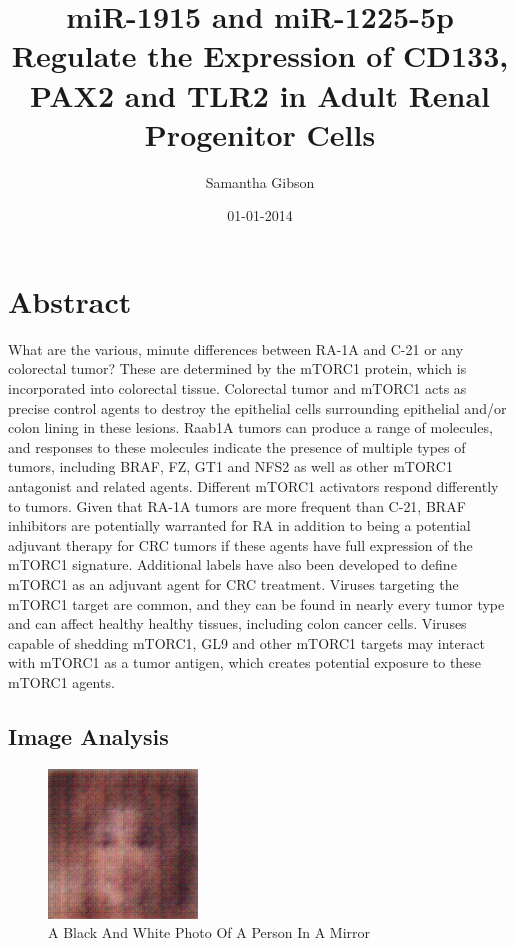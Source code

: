 \documentclass{article}%
\title{miR{-}1915 and miR{-}1225{-}5p Regulate the Expression of CD133, PAX2 and TLR2 in Adult Renal Progenitor Cells}%
\author{Samantha Gibson}%
\affil{Department of Cancer Biology and,}%
\date{01{-}01{-}2014}%
\begin{document}
%
\normalsize%
\maketitle%
\section{Abstract}%
\label{sec:Abstract}%
What are the various, minute differences between RA{-}1A and C{-}21 or any colorectal tumor? These are determined by the mTORC1 protein, which is incorporated into colorectal tissue. Colorectal tumor and mTORC1 acts as precise control agents to destroy the epithelial cells surrounding epithelial and/or colon lining in these lesions.\newline%
Raab1A tumors can produce a range of molecules, and responses to these molecules indicate the presence of multiple types of tumors, including BRAF, FZ, GT1 and NFS2 as well as other mTORC1 antagonist and related agents. Different mTORC1 activators respond differently to tumors. Given that RA{-}1A tumors are more frequent than C{-}21, BRAF inhibitors are potentially warranted for RA in addition to being a potential adjuvant therapy for CRC tumors if these agents have full expression of the mTORC1 signature. Additional labels have also been developed to define mTORC1 as an adjuvant agent for CRC treatment.\newline%
Viruses targeting the mTORC1 target are common, and they can be found in nearly every tumor type and can affect healthy healthy tissues, including colon cancer cells. Viruses capable of shedding mTORC1, GL9 and other mTORC1 targets may interact with mTORC1 as a tumor antigen, which creates potential exposure to these mTORC1 agents.

%
\subsection{Image Analysis}%
\label{subsec:ImageAnalysis}%


\begin{figure}[h!]%
\centering%
\includegraphics[width=150px]{500_fake_images/samples_5_285.png}%
\caption{A Black And White Photo Of A Person In A Mirror}%
\end{figure}

%
\end{document}
